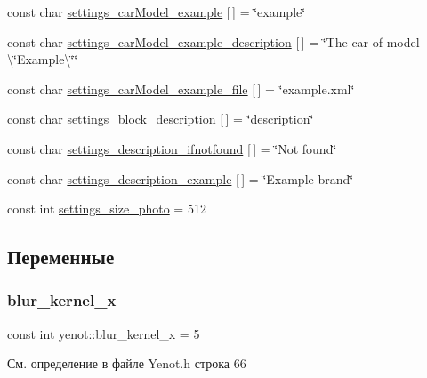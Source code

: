 \begin{DoxyCompactItemize}
\item 
const char \mbox{\hyperlink{namespaceyenot_af238d0e227de22ee3c26114077153efc}{settings\+\_\+car\+Model\+\_\+example}} \mbox{[}$\,$\mbox{]} = \char`\"{}example\char`\"{}
\item 
const char \mbox{\hyperlink{namespaceyenot_a5f4aa342b4a3e3f87069f6fef812594a}{settings\+\_\+car\+Model\+\_\+example\+\_\+description}} \mbox{[}$\,$\mbox{]} = \char`\"{}The car of model \textbackslash{}\char`\"{}Example\textbackslash{}\char`\"{}\char`\"{}
\item 
const char \mbox{\hyperlink{namespaceyenot_acd910e59eb17aa18802af8f4544aab48}{settings\+\_\+car\+Model\+\_\+example\+\_\+file}} \mbox{[}$\,$\mbox{]} = \char`\"{}example.\+xml\char`\"{}
\item 
const char \mbox{\hyperlink{namespaceyenot_aea7e9eb4d5b9e645f22e83e2d5fe893e}{settings\+\_\+block\+\_\+description}} \mbox{[}$\,$\mbox{]} = \char`\"{}description\char`\"{}
\item 
const char \mbox{\hyperlink{namespaceyenot_a53b4bd62fd7a6e3abedfdfb47db53284}{settings\+\_\+description\+\_\+ifnotfound}} \mbox{[}$\,$\mbox{]} = \char`\"{}Not found\char`\"{}
\item 
const char \mbox{\hyperlink{namespaceyenot_a37f90b0081fe0617055470d46489ea0f}{settings\+\_\+description\+\_\+example}} \mbox{[}$\,$\mbox{]} = \char`\"{}Example brand\char`\"{}
\item 
const int \mbox{\hyperlink{namespaceyenot_a4e9a58fa114bcb3d3ae09fb62129f2c9}{settings\+\_\+size\+\_\+photo}} = 512
\end{DoxyCompactItemize}


\subsection{Переменные}
\mbox{\label{namespaceyenot_a1b60119efa619ee2a1a927d430e984d2}} 
\subsubsection{\texorpdfstring{blur\+\_\+kernel\+\_\+x}{blur\_kernel\_x}}
{\footnotesize\ttfamily const int yenot\+::blur\+\_\+kernel\+\_\+x = 5}



См. определение в файле Yenot.\+h строка 66

